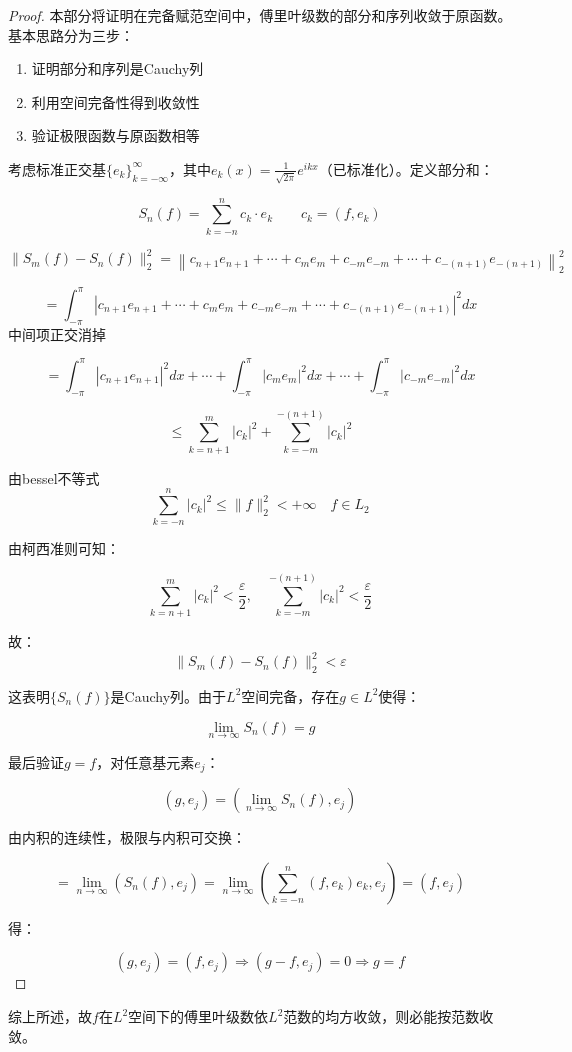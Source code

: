 \documentclass[12pt,a4paper]{article}
\numberwithin{subsection}{section}   %
\numberwithin{subsubsection}{subsection}
\theoremstyle{plain}
\theoremstyle{definition}
\theoremstyle{remark}
\theoremstyle{remark}
\begin{document}
	\begin{proof}
	本部分将证明在完备赋范空间中，傅里叶级数的部分和序列收敛于原函数。基本思路分为三步：
	\begin{enumerate}
		\item 证明部分和序列是Cauchy列
		\item 利用空间完备性得到收敛性
		\item 验证极限函数与原函数相等
	\end{enumerate}
	
	考虑标准正交基$\{e_k\}_{k=-\infty}^\infty$，其中$e_k(x) = \frac{1}{\sqrt{2\pi}}e^{ikx}$（已标准化）。定义部分和：
	

		\[
	S_n(f) = \sum_{k=-n}^n c_k \cdot e_k \quad \quad c_k = (f, e_k)
	\]
	
	\[
	\| S_m(f) - S_n(f) \|_2^2 = \left\| c_{n+1} e_{n+1} + \cdots + c_m e_m + c_{-m} e_{-m} + \cdots + c_{-(n+1)} e_{-(n+1)} \right\|_2^2
	\]
	
	\[
	= \int_{-\pi}^\pi \left| c_{n+1} e_{n+1} + \cdots + c_m e_m + c_{-m} e_{-m} + \cdots + c_{-(n+1)} e_{-(n+1)} \right|^2 dx
	\]
	中间项正交消掉
	
	\[
	= \int_{-\pi}^\pi |c_{n+1} e_{n+1}|^2 dx + \cdots + \int_{-\pi}^\pi |c_m e_m|^2 dx + \cdots + \int_{-\pi}^\pi |c_{-m} e_{-m}|^2 dx
	\]
	
	\[
	\leq \sum_{k=n+1}^m  |c_k|^2 + \sum_{k=-m}^{-(n+1)} |c_k|^2
	\]
	
	由bessel不等式
	\[
 \sum_{k=-n}^n |c_k|^2 \leq \|f\|_2^2 < +\infty \quad f \in L_2
	\]
	
	由柯西准则可知：
	
	\[
	\sum_{k=n+1}^m |c_k|^2 < \frac{\varepsilon}{2}, \quad \sum_{k=-m}^{-(n+1)} |c_k|^2 < \frac{\varepsilon}{2}
	\]
	
	故：
	\[
	\| S_m(f) - S_n(f) \|_2^2 < \varepsilon 
	\]
	
	这表明$\{S_n(f)\}$是Cauchy列。由于$L^2$空间完备，存在$g \in L^2$使得：

\[
\lim_{n \to \infty} S_n(f) = g
\]
	

最后验证$g = f$，对任意基元素$e_j$：
	
	\[
	(g, e_j) = \left( \lim_{n \to \infty} S_n(f), e_j \right)
	\]
	
	由内积的连续性，极限与内积可交换：
	
	\[
	= \lim_{n \to \infty} (S_n(f), e_j) = \lim_{n \to \infty} \left( \sum_{k=-n}^n (f, e_k) e_k, e_j \right) = (f, e_j)
	\]
	
	得：
	
	\[
	(g, e_j) = (f, e_j) \Rightarrow (g - f, e_j) = 0 \Rightarrow g = f
	\]
	
\end{proof}
	
综上所述，故$f$在$L^2$空间下的傅里叶级数依$L^2$范数的均方收敛，则必能按范数收敛。
	


	
\end{document}
